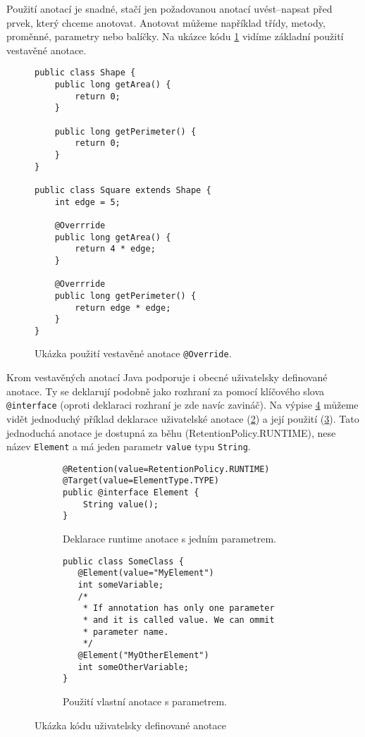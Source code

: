 Použití anotací je snadné, stačí jen požadovanou anotací uvést--napsat před prvek, který chceme anotovat. Anotovat můžeme například třídy, metody, proměnné, parametry nebo balíčky.
Na ukázce kódu \ref{code:ann:bultin} vidíme základní použití vestavěné anotace.
\begin{figure}[!h]
\begin{lstlisting}
public class Shape {
    public long getArea() {
        return 0;
    }
    
    public long getPerimeter() {
        return 0;
    } 
}

public class Square extends Shape {
    int edge = 5;
    
    @Overrride
    public long getArea() {
        return 4 * edge;
    }
    
    @Overrride
    public long getPerimeter() {
        return edge * edge;
    }
}
\end{lstlisting}
\caption{Ukázka použití vestavěné anotace \texttt{@Override}.}
\label{code:ann:bultin}
\end{figure}

Krom vestavěných anotací Java podporuje i obecné uživatelsky definované anotace. Ty se deklarují podobně jako rozhraní za pomocí klíčového slova \texttt{@interface} (oproti deklaraci rozhraní je zde navíc zavináč). Na výpise \ref{code:ann:ud} můžeme vidět jednoduchý příklad deklarace uživatelské anotace (\ref{code:ann:ud:run:dec}) a její použití (\ref{code:ann:ud:run:use}). Tato jednoduchá anotace je dostupná za běhu (RetentionPolicy.RUNTIME), nese název \texttt{Element} a má jeden parametr \texttt{value} typu \texttt{String}. 
\begin{figure}
\begin{subfigure}[b]{1\textwidth}
\caption{Deklarace runtime anotace s jedním parametrem.}
\label{code:ann:ud:run:dec}
\begin{lstlisting}
@Retention(value=RetentionPolicy.RUNTIME)
@Target(value=ElementType.TYPE)
public @interface Element {
    String value(); 
}
\end{lstlisting}
\end{subfigure}
\begin{subfigure}[b]{1\textwidth}
\caption{Použití vlastní anotace s parametrem.}
\label{code:ann:ud:run:use}
\begin{lstlisting}
public class SomeClass {
   @Element(value="MyElement")
   int someVariable;
   /* 
    * If annotation has only one parameter
    * and it is called value. We can ommit
    * parameter name.
    */
   @Element("MyOtherElement")
   int someOtherVariable;
}
\end{lstlisting}
\end{subfigure}
\caption{Ukázka kódu uživatelsky definované anotace}\label{code:ann:ud}
\end{figure}
